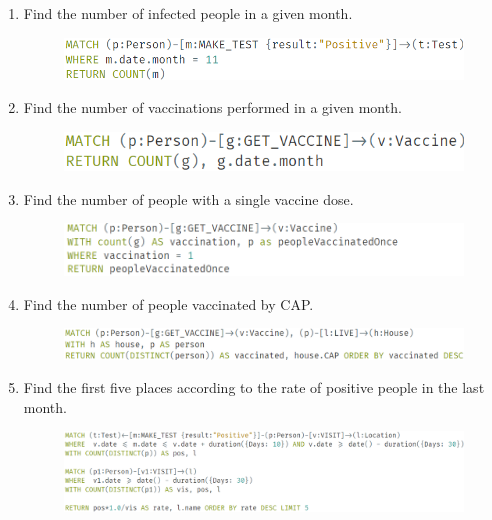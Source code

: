 \begin{enumerate}[leftmargin=*,label=\textbf{\thesection.\arabic*}]
\begin{figure}[h]
    \end{figure} 
    \item Find the number of infected people in a given month.
    \begin{figure}[h]
    \centering
        \includegraphics[width=\textwidth]{images/positives_given_month.png}
    \end{figure} 
    \item Find the number of vaccinations performed in a given month.
    \begin{figure}[h]
        \includegraphics[scale = 0.7]{images/vaccinated_per_month.png}
    \end{figure}     
    \item Find the number of people with a single vaccine dose.
    \begin{figure}[!htb]
        \centering
        \includegraphics[scale = 0.7]{images/vaccinated_once.png}
    \end{figure} 
    \item Find the number of people vaccinated by CAP.
    \begin{figure}[!htb]
        \centering
        \includegraphics[width=\textwidth]{images/vaccinated_per_cap.png}
    \end{figure} 
    \item Find the first five places according to the rate of positive people in the last month.
    \begin{figure}[!htb]
        \centering
        \includegraphics[width=\textwidth]{images/top_5_locations.png}

\end{figure}
\end{enumerate}
